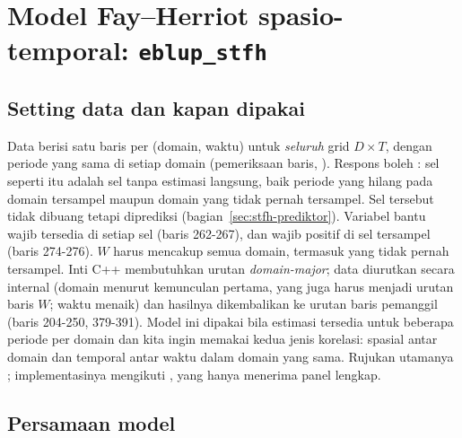 \section{Model Fay--Herriot spasio-temporal: \texttt{eblup\_stfh}}\label{sec:stfh}

\subsection{Setting data dan kapan dipakai}\label{sec:stfh-setting}

Data berisi satu baris per (domain, waktu) untuk \emph{seluruh} grid
$D\times T$, dengan periode yang sama di setiap domain (pemeriksaan baris,
). Respons boleh : sel seperti itu
adalah sel tanpa estimasi langsung, baik periode yang hilang pada domain
tersampel maupun domain yang tidak pernah tersampel. Sel tersebut tidak
dibuang tetapi diprediksi (bagian~\ref{sec:stfh-prediktor}). Variabel bantu
wajib tersedia di setiap sel (baris 262-267), dan  wajib positif
di sel tersampel (baris 274-276). $W$ harus mencakup semua domain, termasuk
yang tidak pernah tersampel. Inti C++ membutuhkan urutan \emph{domain-major};
data diurutkan secara internal (domain menurut kemunculan pertama, yang juga
harus menjadi urutan baris $W$; waktu menaik) dan hasilnya dikembalikan ke
urutan baris pemanggil (baris 204-250, 379-391). Model ini dipakai bila
estimasi tersedia untuk beberapa periode per domain dan kita ingin memakai
kedua jenis korelasi: spasial antar domain dan temporal antar waktu dalam
domain yang sama. Rujukan utamanya \citet{marhuenda2013small};
implementasinya mengikuti , yang hanya menerima panel
lengkap.

\subsection{Persamaan model}\label{sec:stfh-model}

